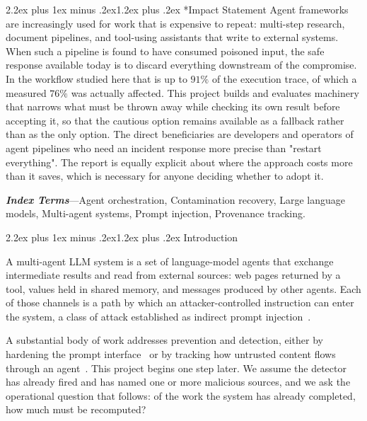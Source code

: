 \documentclass[10pt,twocolumn,a4paper]{article}
\makeatletter
\renewcommand{\section}{\@startsection{section}{1}{\z@}%
  {2.2ex plus 1ex minus .2ex}{1.2ex plus .2ex}%
  {\centering\normalfont\normalsize\scshape}}
\makeatother
\begin{document}
\section*{Impact Statement}
Agent frameworks are increasingly used for work that is expensive to repeat:
multi-step research, document pipelines, and tool-using assistants that write
to external systems. When such a pipeline is found to have consumed poisoned
input, the safe response available today is to discard everything downstream of
the compromise. In the workflow studied here that is up to $91\%$ of the
execution trace, of which a measured $76\%$ was actually affected. This project
builds and evaluates machinery that narrows what must be thrown away while
checking its own result before accepting it, so that the cautious option
remains available as a fallback rather than as the only option. The direct
beneficiaries are developers and operators of agent pipelines who need an
incident response more precise than "restart everything". The report is equally
explicit about where the approach costs more than it saves, which is necessary
for anyone deciding whether to adopt it.

\vspace{0.6em}
\noindent\textbf{\textit{Index Terms}}---Agent orchestration, Contamination
recovery, Large language models, Multi-agent systems, Prompt injection,
Provenance tracking.
\vspace{0.6em}

\section{Introduction}

A multi-agent LLM system is a set of language-model agents that exchange
intermediate results and read from external sources: web pages returned by a
tool, values held in shared memory, and messages produced by other agents. Each
of those channels is a path by which an attacker-controlled instruction can
enter the system, a class of attack established as indirect prompt
injection~\cite{greshake2023,perez2022,liu2024}.

A substantial body of work addresses prevention and detection, either by
hardening the prompt interface~\cite{chen2024} or by tracking how untrusted
content flows through an agent~\cite{neurotaint2026,granularity2026}. This
project begins one step later. We assume the detector has already fired and has
named one or more malicious sources, and we ask the operational question that
follows: of the work the system has already completed, how much must be
recomputed?
\end{document}
